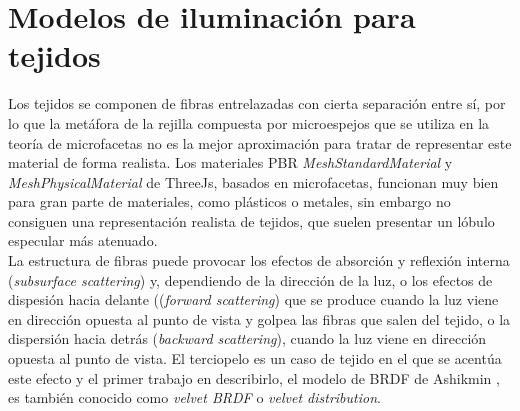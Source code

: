 \chapter{Modelos de iluminaci\'on para tejidos}
Los tejidos se componen de fibras entrelazadas con cierta separaci\'on entre s\'i, por lo que la met\'afora de la
rejilla compuesta por microespejos que se utiliza en la teor\'ia de microfacetas no es la mejor aproximaci\'on para tratar
de representar este material de forma realista. Los materiales PBR \textit{MeshStandardMaterial} y \textit{MeshPhysicalMaterial} de
ThreeJs, basados en microfacetas, funcionan muy bien para gran parte de materiales, como pl\'asticos o metales, sin embargo no consiguen
una representaci\'on realista de tejidos, que suelen presentar un l\'obulo especular m\'as atenuado.\\

La estructura de fibras puede provocar los efectos de absorci\'on y reflexi\'on interna (\textit{subsurface scattering}) y, dependiendo
de la direcci\'on de la luz, o los efectos de dispesi\'on hacia delante ((\textit{forward scattering}) que se produce cuando la luz viene
en direcci\'on opuesta al punto de vista y golpea las fibras que salen del tejido, o la dispersi\'on hacia detr\'as (\textit{backward scattering}),
cuando la luz viene en direcci\'on opuesta al punto de vista. El terciopelo es un caso de tejido en el que se acent\'ua este efecto y el primer
trabajo en describirlo, el modelo de BRDF de Ashikmin \autocite{ashikhmin}, es tambi\'en conocido como \textit{velvet BRDF} o
\textit{velvet distribution}.\\


